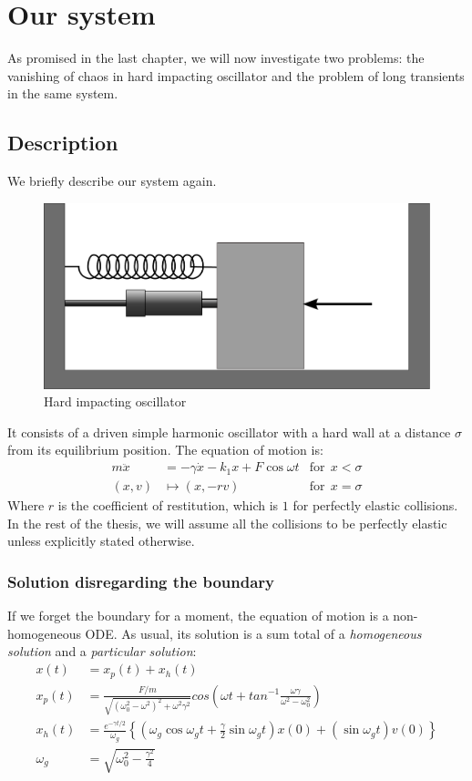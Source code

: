 \documentclass{book}
\renewcommand{\(}{\begin{columns}}
\renewcommand{\)}{\end{columns}}
\newcommand{\<}[1]{\begin{column}{#1}}
\renewcommand{\>}{\end{column}}
\begin{document}
\chapter{Our system}
As promised in the last chapter, we will now investigate two problems: the 
vanishing of chaos in hard impacting oscillator and the problem of long 
transients in the same system.  
\section{Description}
We briefly describe our system again.  
\begin{figure}[!hbp]
\caption{Hard impacting oscillator}
\begin{center}
\includegraphics[width=0.5\columnwidth]{hardcol}
\end{center}
\end{figure}

It consists of a driven simple harmonic oscillator with a hard wall at a distance 
$\sigma$ from its equilibrium position.   The equation of motion is:
\begin{align}
\label{eq-hard_impact2}
m\ddot{x}&=-\gamma \dot{x}-k_1x+F\cos{\omega t}&\mathrm{for}~~x<\sigma\\
(x,v)&\mapsto (x,-rv)&\mathrm{for}~~x=\sigma
\end{align}
Where $r$ is the coefficient of restitution, which is $1$ for perfectly 
elastic collisions.  In the rest of the thesis, we will assume all the 
collisions to be perfectly elastic unless explicitly stated otherwise.  

\subsection{Solution disregarding the boundary}
If we forget the boundary for a moment, the equation of motion is a non-homogeneous 
ODE.  As usual, its solution is a sum total of a \emph{homogeneous solution} 
and a \emph{particular solution}:
\begin{align}
\label{eq-shm-sol}
x(t)&=x_p(t)+x_h(t)\\
x_p(t)&=\frac{F/m}{\sqrt{(\omega_0^2-\omega^2)^2+\omega^2\gamma^2}}cos(\omega t+tan^{-1}\frac{\omega \gamma}{\omega^2-\omega_0^2})\\
x_h(t)&=\frac{e^{-\gamma t/2}}{\omega_g}\left\{(\omega_g\cos{\omega_gt}+\frac{\gamma}{2}\sin{\omega_gt})x(0) + (\sin{\omega_gt})v(0) \right\}\\
\omega_g&=\sqrt{\omega_0^2-\frac{\gamma^2}{4}}
\end{align}
\end{document}

